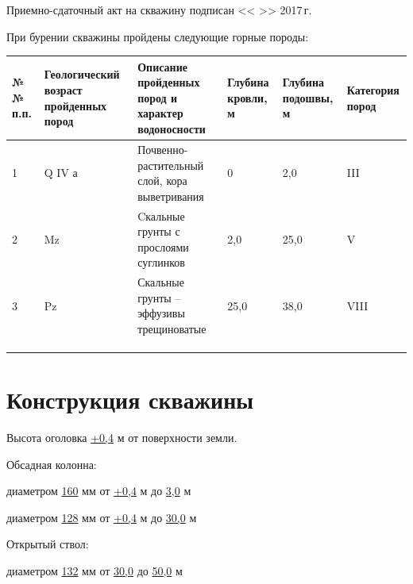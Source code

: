 \documentclass[a4paper,12pt]{article} %
\newcommand{\txtYear}{2017}							%
\newcommand{\txtOgolovok}{+0,4}						%
\newcommand{\txtDepth}{50,0}						%
\newcommand{\txtCondDiam}{160}							%
\newcommand{\txtCondBtm}{3,0}							%
\newcommand{\txtTubeDiam}{128}							%
\newcommand{\txtTubeBtm}{30,0}							%
\begin{document}
	\bigskip
	
	Приемно-сдаточный акт на скважину подписан << \underline{\hspace{0.7cm}} >> \underline{\hspace{3cm}} \txtYear \,г.	
	
	\pagebreak
	
	При бурении скважины пройдены следующие горные породы:

	\begin{table}[!h]\footnotesize
	\centering
	\begin{tabular}{|p{0.7cm}|p{2cm}|p{7cm}|p{1.5cm}|p{1.5cm}|p{1cm}|}
		\hline 
		№№ п.п. & Геологи\-ческий возраст пройденных пород & Описание пройденных пород и характер водоносности & Глубина кровли, м & Глубина подошвы, м & Катего\-рия пород \\ 
		\hline 
		1 & Q IV а & Почвенно-растительный слой, кора выветривания & 0    & 2,0  & III\\ 
		\hline 
		2 & Mz     & Cкальные грунты с прослоями суглинков         & 2,0  & 25,0 & V \\ 
		\hline 
		3 & Pz     & Скальные грунты – эффузивы трещиноватые       & 25,0 & 38,0 & VIII \\ 
		\hline 
		&  &  &  &  &  \\ 
		\hline 
		&  &  &  &  &  \\ 
		\hline 
		&  &  &  &  &  \\ 
		\hline 
	\end{tabular} 
	\end{table}

	\section*{Конструкция скважины}

	Высота оголовка	\underline{\txtOgolovok} м	от поверхности земли. 
	
	\bigskip

	Обсадная колонна:

	диаметром \underline{\txtCondDiam} мм от \underline{\txtOgolovok} м до \underline{\txtCondBtm}  м  		
	
	диаметром \underline{\txtTubeDiam} мм от \underline{\txtOgolovok} м до \underline{\txtTubeBtm} м
	
	\bigskip

	Открытый ствол:

	 диаметром \underline{132} мм от \underline{\txtTubeBtm} до \underline{\txtDepth} м 
    
\end{document}
